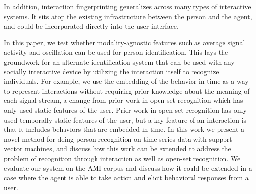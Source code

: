 \documentclass[conference]{IEEEtran}
\newcommand{\meta}[1]{{\textcolor[rgb]{0.1,0.7,0.2}{[JSS: {\it #1}]}}}
\begin{document}
In addition, interaction fingerprinting generalizes across many types of interactive systems. It sits atop the existing infrastructure between the person and the agent, and could be incorporated directly into the user-interface. 



In this paper, we test whether modality-agnostic features such as average signal activity and oscillation can be used for person identification. This lays the groundwork for an alternate identification system that can be used with any socially interactive device by utilizing the interaction itself to recognize individuals. For example, we use the embedding of the behavior in time as a way to represent interactions without requiring prior knowledge about the meaning of each signal stream, a change from prior work in open-set recognition which has only used static features of the user. Prior work in open-set recognition has only used temporally static features of the user, but a key feature of an interaction is that it includes behaviors that are embedded in time. In this work we present a novel method for doing person recognition on time-series data with support vector machines, and discuss how this work can be extended to address the problem of recognition through interaction as well as open-set recognition. We evaluate our system on the AMI corpus \cite{kilgour_ami_nodate} and discuss how it could be extended in a case where the agent is able to take action and elicit behavioral responses from a user. 
\end{document}
